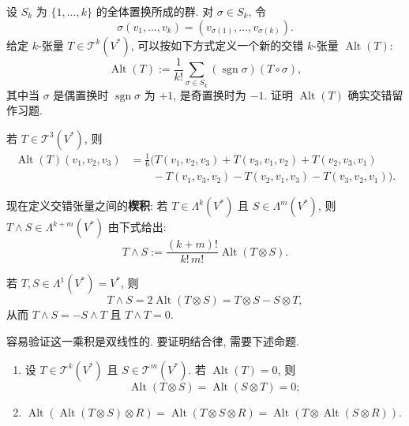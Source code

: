 设 $S_k$ 为 $\{1,\ldots,k\}$ 的全体置换所成的群. 对 $\sigma\in S_k$, 令
\[
  \sigma(v_1,\ldots,v_k)=(v_{\sigma(1)},\ldots,v_{\sigma(k)}).
\]
给定 $k$-张量 $T\in\mathcal{T}^k(V^*)$, 可以按如下方式定义一个新的交错 $k$-张量 $\operatorname{Alt}(T)$:
\[
  \operatorname{Alt}(T):=\frac{1}{k!}\sum_{\sigma\in S_k}
    (\operatorname{sgn}\sigma)(T\circ\sigma),
\]
其中当 $\sigma$ 是偶置换时 $\operatorname{sgn}\sigma$ 为 $+1$, 是奇置换时为 $-1$. 证明 $\operatorname{Alt}(T)$ 确实交错留作习题.

\begin{RiemannExample}\label{ex:alternation-of-three-tensor}
若 $T\in\mathcal{T}^3(V^*)$, 则
\begin{align*}
  \operatorname{Alt}(T)(v_1,v_2,v_3)
    &=\tfrac16\bigl(T(v_1,v_2,v_3)+T(v_3,v_1,v_2)+T(v_2,v_3,v_1)\\
    &\qquad-T(v_1,v_3,v_2)-T(v_2,v_1,v_3)-T(v_3,v_2,v_1)\bigr).
\end{align*}
\end{RiemannExample}

现在定义交错张量之间的\textbf{楔积}: 若 $T\in\Lambda^k(V^*)$ 且 $S\in\Lambda^m(V^*)$, 则 $T\wedge S\in\Lambda^{k+m}(V^*)$ 由下式给出:
\[
  T\wedge S:=\frac{(k+m)!}{k!\,m!}\operatorname{Alt}(T\otimes S).
\]
\begin{RiemannExample}\label{ex:wedge-of-linear-functionals}
若 $T,S\in\Lambda^1(V^*)=V^*$, 则
\[
  T\wedge S=2\operatorname{Alt}(T\otimes S)=T\otimes S-S\otimes T,
\]
从而 $T\wedge S=-S\wedge T$ 且 $T\wedge T=0$.
\end{RiemannExample}

容易验证这一乘积是双线性的. 要证明结合律, 需要下述命题.

\begin{RiemannProposition}\label{prop:alternation-and-tensor-product}
\begin{enumerate}[label=(\roman*),leftmargin=*]
\item 设 $T\in\mathcal{T}^k(V^*)$ 且 $S\in\mathcal{T}^m(V^*)$. 若 $\operatorname{Alt}(T)=0$, 则
\[
  \operatorname{Alt}(T\otimes S)=\operatorname{Alt}(S\otimes T)=0;
\]
\item $\operatorname{Alt}(\operatorname{Alt}(T\otimes S)\otimes R)
  =\operatorname{Alt}(T\otimes S\otimes R)
  =\operatorname{Alt}(T\otimes\operatorname{Alt}(S\otimes R))$.
\end{enumerate}
\end{RiemannProposition}

